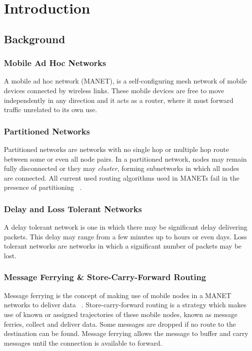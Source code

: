 \chapter{Introduction} 

\section{Background}

\subsection{Mobile Ad Hoc Networks}
A mobile ad hoc network (MANET),  is a self-configuring mesh network of mobile devices connected by wireless links.  
These mobile devices are free to move independently in any direction and it acts as a router, where it must forward traffic unrelated to its own use.

\subsection{Partitioned Networks}
Partitioned networks are networks with no single hop or multiple hop route between some or even all node pairs. %
In a partitioned network, nodes may remain fully disconnected or they may \emph{cluster}, forming subnetworks in which all nodes are connected.
All current used routing algorithms used in MANETs %
fail in the presence of partitioning ~\cite{Routing}.

\subsection{Delay and Loss Tolerant Networks}
\label{sec:delay_loss_tolerant}
A delay tolerant network is one in which there may be significant delay delivering packets.
This delay may range from a few minutes up to hours or even days. %
Loss tolerant networks are networks in which a significant number of packets may be lost.

\subsection{Message Ferrying \& Store-Carry-Forward Routing}
\label{sec:ferrying_overview}
Message ferrying is the concept of making use of mobile nodes in a MANET networks to deliver data ~\cite{adhocmsgferry}.
Store-carry-forward routing is a strategy which makes use of known or assigned trajectories of these mobile nodes, known as message ferries, collect and deliver data.
Some messages are dropped if no route to the destination can be found.  
Message ferrying allows the message to buffer and carry messages until the connection is available to forward.

